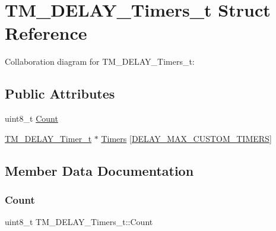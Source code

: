 \hypertarget{struct_t_m___d_e_l_a_y___timers__t}{}\section{T\+M\+\_\+\+D\+E\+L\+A\+Y\+\_\+\+Timers\+\_\+t Struct Reference}
\label{struct_t_m___d_e_l_a_y___timers__t}


Collaboration diagram for T\+M\+\_\+\+D\+E\+L\+A\+Y\+\_\+\+Timers\+\_\+t\+:
\subsection*{Public Attributes}
\begin{DoxyCompactItemize}
\item 
uint8\+\_\+t \hyperlink{struct_t_m___d_e_l_a_y___timers__t_a8fcf8463f72924bebb7c1b9180b2a26c}{Count}
\item 
\hyperlink{group___t_m___d_e_l_a_y___typedefs_gaf0beeb077a757f34c8b176464d9a0e85}{T\+M\+\_\+\+D\+E\+L\+A\+Y\+\_\+\+Timer\+\_\+t} $\ast$ \hyperlink{struct_t_m___d_e_l_a_y___timers__t_a2e9d161ecf8630d42fd54373766b451a}{Timers} \mbox{[}\hyperlink{group___t_m___d_e_l_a_y___macros_ga4430f41745879f32d4be22748ba2fbcd}{D\+E\+L\+A\+Y\+\_\+\+M\+A\+X\+\_\+\+C\+U\+S\+T\+O\+M\+\_\+\+T\+I\+M\+E\+RS}\mbox{]}
\end{DoxyCompactItemize}


\subsection{Member Data Documentation}
\mbox{\label{struct_t_m___d_e_l_a_y___timers__t_a8fcf8463f72924bebb7c1b9180b2a26c}} 
\subsubsection{\texorpdfstring{Count}{Count}}
{\footnotesize\ttfamily uint8\+\_\+t T\+M\+\_\+\+D\+E\+L\+A\+Y\+\_\+\+Timers\+\_\+t\+::\+Count}

\mbox{\label{struct_t_m___d_e_l_a_y___timers__t_a2e9d161ecf8630d42fd54373766b451a}} 
